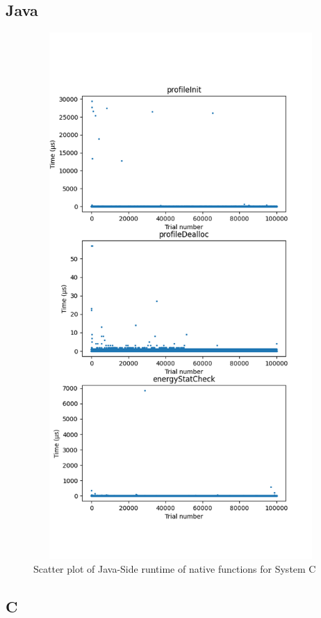 \documentclass{article}
\begin{document}
\subsection{Java}
    \begin{figure}[H]
   	\centering
    	\includegraphics[width=17cm,height=20cm,keepaspectratio]{RuntimeResults_SystemC/JavaFunctions/runtime-scatters.png}
    	\caption{Scatter plot of Java-Side runtime of native functions for System C}
    	\label{fig:Java-FunctionsSystemC}
    \end{figure}

\subsection{C}
\end{document}

